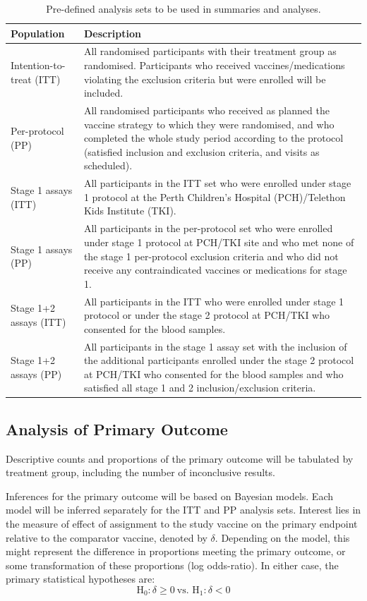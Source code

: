 \documentclass{bmcart}
\begin{document}
\renewcommand{\arraystretch}{2}
\begin{table}[!ht]
	\caption{Pre-defined analysis sets to be used in summaries and analyses.}
	\label{tab:analysis-sets}
	\begin{tabular}{lp{8cm}}
		Population & Description \\ \hline
		Intention-to-treat (ITT) & All randomised participants with their treatment group as randomised. Participants who received vaccines/medications violating the exclusion criteria but were enrolled will be included. \\
		Per-protocol (PP) & All randomised participants who received as planned the vaccine strategy to which they were randomised, and who completed the whole study period according to the protocol (satisfied inclusion and exclusion criteria, and visits as scheduled).
		\\
		Stage 1 assays (ITT) & All participants in the ITT set who were enrolled under stage 1 protocol at the Perth Children's Hospital (PCH)/Telethon Kids Institute (TKI). \\
		Stage 1 assays (PP) & All participants in the per-protocol set who were enrolled under stage 1 protocol at PCH/TKI site and who met none of the stage 1 per-protocol exclusion criteria and who did not receive any contraindicated vaccines or medications for stage 1.\\
		Stage 1+2 assays (ITT) & All participants in the ITT  who were enrolled under stage 1 protocol or under the stage 2 protocol at PCH/TKI who consented for the blood samples. \\
		Stage 1+2 assays (PP) & All participants in the stage 1 assay set with the inclusion of the additional participants enrolled under the stage 2 protocol at PCH/TKI who consented for the blood samples and who satisfied all stage 1 and 2 inclusion/exclusion criteria. \\
		\hline
	\end{tabular}
\end{table}
\renewcommand{\arraystretch}{1.25}

\subsection*{Analysis of Primary Outcome}

Descriptive counts and proportions of the primary outcome will be tabulated by treatment group, including the number of inconclusive results.

Inferences for the primary outcome will be based on Bayesian models.
Each model will be inferred separately for the ITT and PP analysis sets.
Interest lies in the measure of effect of assignment to the study vaccine on the primary endpoint relative to the comparator vaccine, denoted by \(\delta\).
Depending on the model, this might represent the difference in proportions meeting the primary outcome, or some transformation of these proportions (log odds-ratio).
In either case, the primary statistical hypotheses are:
$$
\textrm{H}_0:\delta\geq 0\ \text{vs. } \mathrm{H}_1:\delta <0
$$
\end{document}
